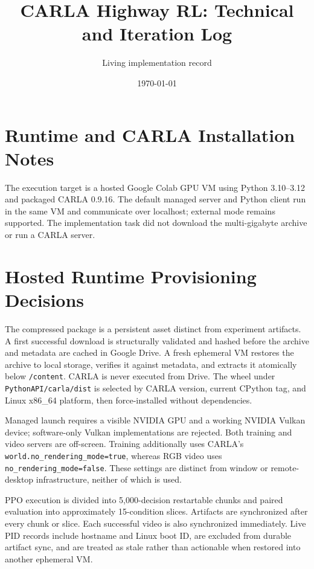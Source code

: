 \documentclass[10pt]{article}
\title{CARLA Highway RL: Technical and Iteration Log}
\author{Living implementation record}
\date{\today}
\begin{document}
\maketitle


\section{Runtime and CARLA Installation Notes}
The execution target is a hosted Google Colab GPU VM using Python 3.10--3.12
and packaged CARLA 0.9.16. The default managed server and Python client run in
the same VM and communicate over localhost; external mode remains supported.
The implementation task did not download the multi-gigabyte archive or run a
CARLA server.

\section{Hosted Runtime Provisioning Decisions}
The compressed package is a persistent asset distinct from experiment
artifacts. A first successful download is structurally validated and hashed
before the archive and metadata are cached in Google Drive. A fresh ephemeral
VM restores the archive to local storage, verifies it against metadata, and
extracts it atomically below \texttt{/content}. CARLA is never executed from
Drive. The wheel under \texttt{PythonAPI/carla/dist} is selected by CARLA
version, current CPython tag, and Linux x86\_64 platform, then force-installed
without dependencies.

Managed launch requires a visible NVIDIA GPU and a working NVIDIA Vulkan
device; software-only Vulkan implementations are rejected. Both training and video
servers are off-screen. Training additionally uses CARLA's
\texttt{world.no\_rendering\_mode=true}, whereas RGB video uses
\texttt{no\_rendering\_mode=false}. These settings are distinct from window or
remote-desktop infrastructure, neither of which is used.

PPO execution is divided into 5,000-decision restartable chunks and paired
evaluation into approximately 15-condition slices. Artifacts are synchronized
after every chunk or slice. Each successful video is also synchronized
immediately. Live PID records include hostname and Linux boot ID, are excluded
from durable artifact sync, and are treated as stale rather than actionable
when restored into another ephemeral VM.
\end{document}
